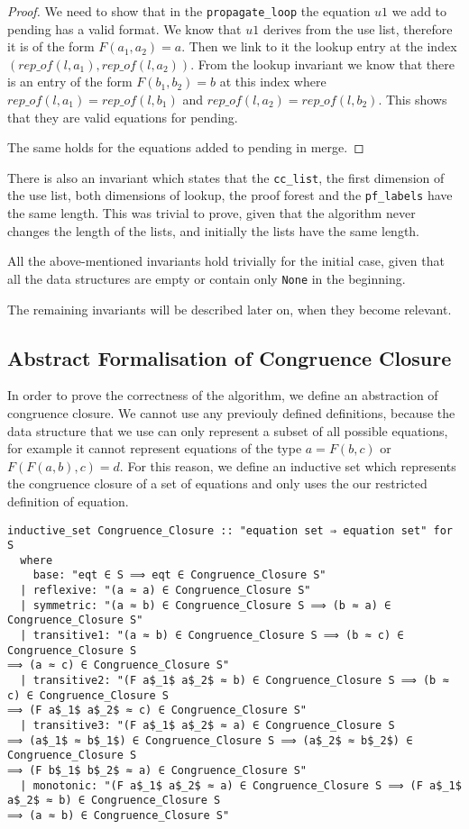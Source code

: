 \begin{proof}
We need to show that in the \lstinline{propagate_loop} the equation $u1$ we add to pending has a valid format. We know that $u1$ derives from the use list, therefore it is of the form $F(a_1, a_2) = a$. Then we link to it the lookup entry at the index $(rep\_of(l, a_1), rep\_of(l, a_2))$. From the lookup invariant we know that there is an entry of the form $F(b_1, b_2) = b$ at this index where $rep\_of(l, a_1) = rep\_of(l, b_1)$ and $rep\_of(l, a_2) = rep\_of(l, b_2)$. This shows that they are valid equations for pending.

The same holds for the equations added to pending in merge.
\end{proof}

There is also an invariant which states that the \lstinline{cc_list}, the first dimension of the use list, both dimensions of lookup, the proof forest and the \lstinline{pf_labels} have the same length. This was trivial to prove, given that the algorithm never changes the length of the lists, and initially the lists have the same length.

All the above-mentioned invariants hold trivially for the initial case, given that all the data structures are empty or contain only \lstinline{None} in the beginning.

The remaining invariants will be described later on, when they become relevant.


\subsection{Abstract Formalisation of Congruence Closure}
\label{subsection:abstraction}

In order to prove the correctness of the algorithm, we define an abstraction of congruence closure. We cannot use any previouly defined definitions, because the data structure that we use can only represent a subset of all possible equations, for example it cannot represent equations of the type $a = F(b, c)$ or $F (F (a, b), c) = d$. For this reason, we define an inductive set which represents the congruence closure of a set of equations and only uses the our restricted definition of equation.

\begin{lstlisting}
inductive_set Congruence_Closure :: "equation set ⇒ equation set" for S
  where
    base: "eqt ∈ S ⟹ eqt ∈ Congruence_Closure S"
  | reflexive: "(a ≈ a) ∈ Congruence_Closure S"
  | symmetric: "(a ≈ b) ∈ Congruence_Closure S ⟹ (b ≈ a) ∈ Congruence_Closure S"
  | transitive1: "(a ≈ b) ∈ Congruence_Closure S ⟹ (b ≈ c) ∈ Congruence_Closure S
⟹ (a ≈ c) ∈ Congruence_Closure S"
  | transitive2: "(F a$_1$ a$_2$ ≈ b) ∈ Congruence_Closure S ⟹ (b ≈ c) ∈ Congruence_Closure S
⟹ (F a$_1$ a$_2$ ≈ c) ∈ Congruence_Closure S"
  | transitive3: "(F a$_1$ a$_2$ ≈ a) ∈ Congruence_Closure S
⟹ (a$_1$ ≈ b$_1$) ∈ Congruence_Closure S ⟹ (a$_2$ ≈ b$_2$) ∈ Congruence_Closure S
⟹ (F b$_1$ b$_2$ ≈ a) ∈ Congruence_Closure S"
  | monotonic: "(F a$_1$ a$_2$ ≈ a) ∈ Congruence_Closure S ⟹ (F a$_1$ a$_2$ ≈ b) ∈ Congruence_Closure S
⟹ (a ≈ b) ∈ Congruence_Closure S"
\end{lstlisting}

